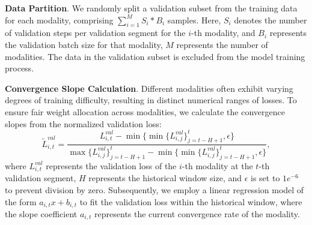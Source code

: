 \textbf{Data Partition}. We randomly split a validation subset from the training data for each modality, comprising $\sum_{i=1}^{M}S_i*B_i$ samples. Here, $S_i$ denotes the number of validation steps per validation segment for the $i$-th modality, and $B_i$ represents the validation batch size for that modality, $M$ represents the number of modalities. The data in the validation subset is excluded from the model training process.

\textbf{Convergence Slope Calculation}. Different modalities often exhibit varying degrees of training difficulty, resulting in distinct numerical ranges of losses. To ensure fair weight allocation across modalities, we calculate the convergence slopes from the normalized validation loss:
\begin{equation}
    \widetilde{L}^{val}_{i, t} = \frac{L^{val}_{i, t} - \min\{\min\{L^{val}_{i, j}\}_{j=t-H+1}^{t}, \epsilon\}}{\max\{L^{val}_{i, j}\}_{j=t-H+1}^{t} - \min\{\min\{L^{val}_{i, j}\}_{j=t-H+1}^{t}, \epsilon\}},
\end{equation}
where $L^{val}_{i, t}$ represents the validation loss of the $i$-th modality at the $t$-th validation segment, $H$ represents the historical window size, and $\epsilon$ is set to $1e^{-6}$ to prevent division by zero. Subsequently, we employ a linear regression model of the form $a_{i, t}x+b_{i, t}$ to fit the validation loss within the historical window, where the slope coefficient $a_{i, t}$ represents the current convergence rate of the modality.

